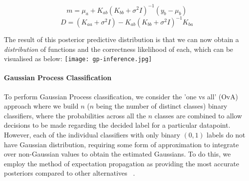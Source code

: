 \documentclass[10pt,sts]{article}
\begin{document}
\begin{multicols}{2}
    $$ m = \mu_a + K_{ab} (K_{bb} + \sigma^2I)^{-1} (y_b - \mu_b) $$
    $$ D = (K_{aa} + \sigma^2I) - K_{ab} (K_{bb}+\sigma^2I)^{-1} K_{ba} $$

    The result of this posterior predictive distribution is that we can now obtain a \textit{distribution} of functions and the correctness likelihood of each, which can be visualised as below:
    \texttt{[image: gp-inference.jpg]}

    \paragraph{Gaussian Process Classification} 
    To perform Gaussian Process classification, we consider the 'one vs all' (OvA) approach where we build $n$ ($n$ being the number of distinct classes) binary classifiers, where the probabilities across all the $n$ classes are combined to allow decisions to be made regarding the decided label for a particular datapoint. However, each of the individual classifiers with only binary $(0, 1)$ labels do not have Gaussian distribution, requiring some form of approximation to integrate over non-Gaussian values to obtain the estimated Gaussians. To do this, we employ the method of expectation propagation as providing the most accurate posteriors compared to other alternatives ~\citep{nickisch08}. 

    
    

\end{multicols}
\end{document}

